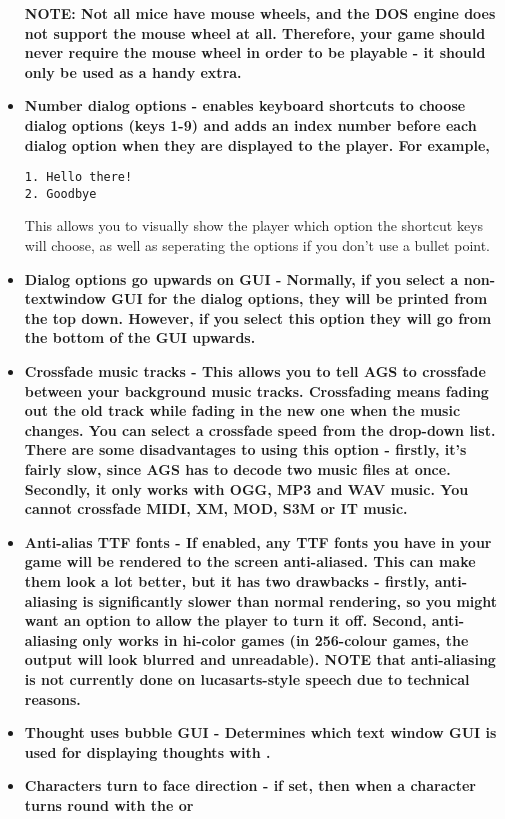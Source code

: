 \begin{itemize}
\bf{NOTE:} Not all mice have mouse wheels, and the DOS engine does not support the
mouse wheel at all. Therefore, your game should never require the mouse wheel in order to
be playable - it should only be used as a handy extra.
\item \bf{Number dialog options} - enables keyboard shortcuts to choose dialog options (keys 1-9) and adds an index number before each dialog option when
they are displayed to the player. For example,
\begin{verbatim}
1. Hello there!
2. Goodbye
\end{verbatim}
This allows you to visually show the player which option the shortcut keys will choose,
as well as seperating the options if you don't use a bullet point.
\item \bf{Dialog options go upwards on GUI} - Normally, if you select a non-textwindow GUI
for the dialog options, they will be printed from the top down. However, if you select this
option they will go from the bottom of the GUI upwards.
\item \bf{Crossfade music tracks} - This allows you to tell AGS to crossfade between your
background music tracks. Crossfading means fading out the old track while fading in the
new one when the music changes. You can select a crossfade speed from the drop-down list.
There are some disadvantages to using this option - firstly, it's fairly slow, since AGS
has to decode two music files at once. Secondly, it only works with OGG, MP3 and WAV music.
You cannot crossfade MIDI, XM, MOD, S3M or IT music.
\item \bf{Anti-alias TTF fonts} - If enabled, any TTF fonts you have in your game will
be rendered to the screen anti-aliased. This can make them look a lot better, but it has
two drawbacks - firstly, anti-aliasing is significantly slower than normal rendering, so
you might want an option to allow the player to turn it off. Second, anti-aliasing only
works in hi-color games (in 256-colour games, the output will look blurred and unreadable).
\bf{NOTE} that anti-aliasing is not currently done on lucasarts-style speech due to
technical reasons.
\item \bf{Thought uses bubble GUI} - Determines which text window GUI is used for displaying
thoughts with .
\item \bf{Characters turn to face direction} - if set, then when a character turns round
with the  or 

\end{itemize}

